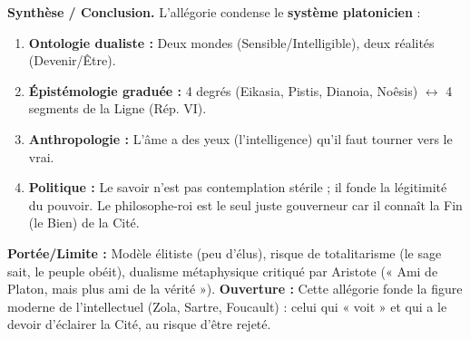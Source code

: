 \documentclass[11pt]{article}
\newcommand{\cle}[1]{{\popxbold\color{popdark}#1}}
\begin{document}
\begin{exoresolu}
\textbf{Synthèse / Conclusion.}
L'allégorie condense le \textbf{système platonicien} :
\begin{enumerate}
    \item \textbf{Ontologie dualiste :} Deux mondes (Sensible/Intelligible), deux réalités (Devenir/Être).
    \item \textbf{Épistémologie graduée :} 4 degrés (Eikasia, Pistis, Dianoia, Noêsis) $\leftrightarrow$ 4 segments de la Ligne (Rép. VI).
    \item \textbf{Anthropologie :} L'âme a des yeux (l'intelligence) qu'il faut tourner vers le vrai.
    \item \textbf{Politique :} Le savoir n'est pas contemplation stérile ; il fonde la légitimité du pouvoir. Le philosophe-roi est le seul juste gouverneur car il connaît la \cle{Fin} (le Bien) de la Cité.
\end{enumerate}
\textbf{Portée/Limite :} Modèle élitiste (peu d'élus), risque de totalitarisme (le sage sait, le peuple obéit), dualisme métaphysique critiqué par Aristote (« Ami de Platon, mais plus ami de la vérité »).
\textbf{Ouverture :} Cette allégorie fonde la figure moderne de l'\cle{intellectuel} (Zola, Sartre, Foucault) : celui qui « voit » et qui a le devoir d'éclairer la Cité, au risque d'être rejeté.
\end{exoresolu}
\end{document}
